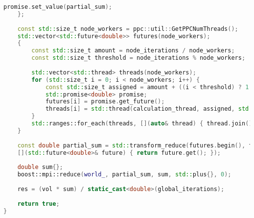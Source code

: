 \documentclass[a4paper,12pt]{article}
\begin{document}
\begin{lstlisting}[language=C++]
		promise.set_value(partial_sum);
	};
	
	const std::size_t node_workers = ppc::util::GetPPCNumThreads();
	std::vector<std::future<double>> futures(node_workers);
	{
		const std::size_t amount = node_iterations / node_workers;
		const std::size_t threshold = node_iterations % node_workers;
		
		std::vector<std::thread> threads(node_workers);
		for (std::size_t i = 0; i < node_workers; i++) {
			const std::size_t assigned = amount + ((i < threshold) ? 1 : 0);
			std::promise<double> promise;
			futures[i] = promise.get_future();
			threads[i] = std::thread(calculation_thread, assigned, std::move(promise));
		}
		std::ranges::for_each(threads, [](auto& thread) { thread.join(); });
	}
	
	const double partial_sum = std::transform_reduce(futures.begin(), futures.end(), 0., std::plus{},
	[](std::future<double>& future) { return future.get(); });
	
	double sum{};
	boost::mpi::reduce(world_, partial_sum, sum, std::plus{}, 0);
	
	res = (vol * sum) / static_cast<double>(global_iterations);
	
	return true;
}
\end{lstlisting}
\end{document}
